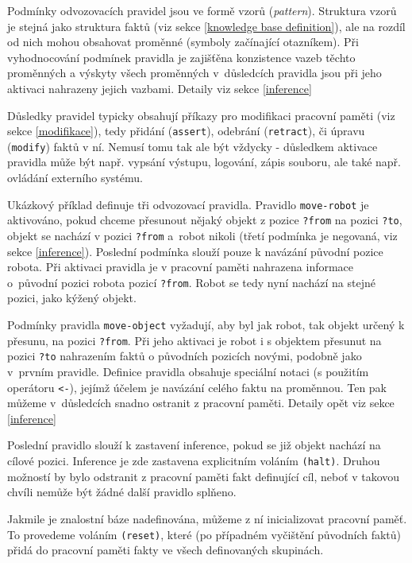 Podmínky odvozovacích pravidel jsou ve formě vzorů (\emph{pattern}). Struktura
vzorů je stejná jako struktura faktů (viz sekce \ref{knowledge base
definition}), ale na rozdíl od nich mohou obsahovat proměnné (symboly začínající
otazníkem).  Při vyhodnocování podmínek pravidla je zajišťěna
konzistence vazeb těchto proměnných a výskyty všech proměnných v~důsledcích
pravidla jsou při jeho aktivaci nahrazeny jejich vazbami. Detaily viz sekce
\ref{inference}

Důsledky pravidel typicky obsahují příkazy pro modifikaci pracovní paměti (viz
sekce \ref{modifikace}), tedy přidání (\verb|assert|), odebrání
(\verb|retract|), či úpravu (\verb|modify|) faktů v ní. Nemusí tomu tak ale být
vždycky - důsledkem aktivace pravidla může být např. vypsání výstupu, logování,
zápis souboru, ale také např. ovládání externího systému.

Ukázkový příklad definuje tři odvozovací pravidla. Pravidlo
\verb|move-robot| je aktivováno, pokud chceme přesunout nějaký objekt z pozice
\verb|?from| na pozici \verb|?to|, objekt se nachází v pozici \verb|?from|
a~robot nikoli (třetí podmínka je negovaná, viz sekce \ref{inference}).
Poslední podmínka slouží pouze k navázání původní pozice robota.  Při aktivaci
pravidla je v pracovní paměti nahrazena informace o~původní pozici robota
pozicí \verb|?from|. Robot se tedy nyní nachází na stejné pozici, jako kýžený
objekt.

Podmínky pravidla \verb|move-object| vyžadují, aby byl jak robot, tak objekt
určený k přesunu, na pozici \verb|?from|. Při jeho aktivaci je robot i s objektem
přesunut na pozici \verb|?to| nahrazením faktů o původních pozicích novými,
podobně jako v~prvním pravidle. Definice pravidla obsahuje speciální notaci (s
použitím operátoru \verb|<-|), jejímž účelem je navázání celého faktu na
proměnnou. Ten pak můžeme v~důsledcích snadno ostranit z pracovní paměti.
Detaily opět viz sekce \ref{inference}

Poslední pravidlo slouží k zastavení inference, pokud se již objekt nachází na
cílové pozici. Inference je zde zastavena explicitním voláním \verb|(halt)|.
Druhou možností by bylo odstranit z pracovní paměti fakt definující cíl, neboť v
takovou chvíli nemůže být žádné další pravidlo splňeno.

Jakmile je znalostní báze nadefinována, můžeme z ní inicializovat pracovní
paměť. To provedeme voláním \verb|(reset)|, které (po případném vyčištění
původních faktů) přidá do pracovní paměti fakty ve všech definovaných skupinách.


